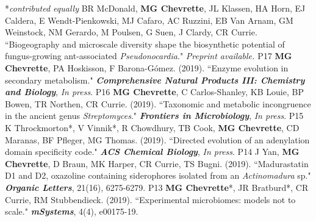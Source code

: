 


\begin{cvpubs}
   \cvpub
    {\hspace{-1cm} *\textit{contributed equally}} %
    {} %
   \cvpub
    {BR McDonald, \textbf{MG Chevrette}, JL Klassen, HA Horn, EJ Caldera, E Wendt-Pienkowski, MJ Cafaro, AC Ruzzini, EB Van Arnam, GM Weinstock, NM Gerardo, M Poulsen, G Suen, J Clardy, CR Currie. ``Biogeography and microscale diversity shape the biosynthetic potential of fungus-growing ant-associated \textit{Pseudonocardia}." \textit{Preprint available. \textbf{}}
    } %
    {P17} %
   \cvpub
    {\textbf{MG Chevrette}, PA Hoskisson, F Barona-G\'{o}mez. (2019). ``Enzyme evolution in secondary metabolism." \textit{\textbf{Comprehensive Natural Products III: Chemistry and Biology}}, \textit{In press}. %
    } %
    {P16} %
   \cvpub
    {\textbf{MG Chevrette}, C Carlos-Shanley, KB Louie, BP Bowen, TR Northen, CR Currie. (2019). ``Taxonomic and metabolic incongruence in the ancient genus \textit{Streptomyces}." \textit{\textbf{Frontiers in Microbiology}}, \textit{In press}. \textbf{\textit{}}
    } %
    {P15} %
   \cvpub
    {K Throckmorton*, V Vinnik*, R Chowdhury, TB Cook, \textbf{MG Chevrette}, CD Maranas, BF Pfleger, MG Thomas. (2019). ``Directed evolution of an adenylation domain specificity code." \textit{\textbf{ACS Chemical Biology}}, \textit{In press}. \textbf{\textit{}}
    } %
    {P14}
   \cvpub
    {J Yan, \textbf{MG Chevrette}, D Braun, MK Harper, CR Currie, TS Bugni. (2019). ``Madurastatin D1 and D2, oxazoline containing siderophores isolated from an \textit{Actinomadura} sp." \textit{\textbf{Organic Letters}},  21(16), 6275-6279. \textbf{\textit{}}
    } %
    {P13}
  \cvpub
    {\textbf{MG Chevrette}*, JR Bratburd*, CR Currie, RM Stubbendieck. (2019). ``Experimental microbiomes: models not to scale." \textit{\textbf{mSystems}}, 4(4), e00175-19. \textbf{\textit{}}
}
\end{cvpubs}
